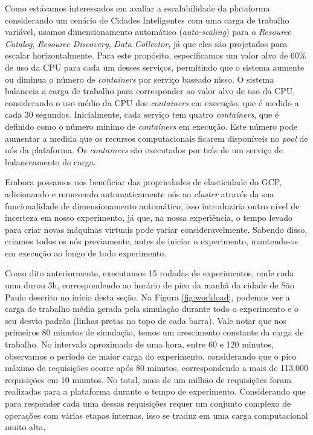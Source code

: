 Como estávamos interessados em avaliar a escalabilidade da plataforma considerando um cenário de Cidades Inteligentes com uma carga de trabalho variável, usamos dimensionamento automático
(\textit{auto-scaling}) para o \textit{Resource Catalog}, \textit{Resource Discovery}, \textit{Data Collector}, já que eles são projetados para escalar horizontalmente.
Para este propósito, especificamos um valor alvo de 60\% de uso da CPU para cada um desses serviços, permitindo que o sistema aumente ou diminua o número de \textit{containers} por serviço baseado nisso.
O sistema balanceia a carga de trabalho para corresponder ao valor alvo de uso da CPU, considerando o uso médio da CPU dos \textit{containers} em execução, que é medido a cada 30 segundos.
Inicialmente, cada serviço tem quatro \textit{containers}, que é definido como o número mínimo de \textit{containers} em execução.
Este número pode aumentar a medida que os recursos computacionais ficarem disponíveis no \textit{pool} de nós da plataforma.
Os \textit{containers} são executados por trás de um serviço de balanceamento de carga.

Embora possamos nos beneficiar das propriedades de elasticidade do GCP, adicionando e removendo automaticamente nós ao \textit{cluster} através da sua funcionalidade de dimensionamento automático,
isso introduziria outro nível de incerteza em nosso experimento, já que, na nossa experiência, o tempo levado para criar novas máquinas virtuais pode variar consideravelmente.
Sabendo disso, criamos todos os nós previamente, antes de iniciar o experimento, mantendo-os em execução ao longo de todo experimento.

Como dito anteriormente, executamos 15 rodadas de experimentos, onde cada uma durou 3h, correspondendo ao horário de pico da manhã da cidade de São Paulo descrito no início desta seção.
Na Figura \ref{fig:workload}, podemos ver a carga de trabalho média gerada pela simulação durante todo o experimento e o seu desvio padrão (linhas pretas no topo de cada barra).
Vale notar que nos primeiros 80 minutos de simulação, temos um crescimento constante da carga de trabalho.
No intervalo aproximado de uma hora, entre 60 e 120 minutos, observamos o período de maior carga do experimento, considerando que o pico máximo de requisições ocorre após 80 minutos, correspondendo a mais
de 113.000 requisições em 10 minutos.
No total, mais de um milhão de requisições foram realizadas para a plataforma durante o tempo de experimento.
Considerando que para responder cada uma dessas requisições requer um conjunto complexo de operações com várias etapas internas, isso se traduz em uma carga computacional muito alta.

